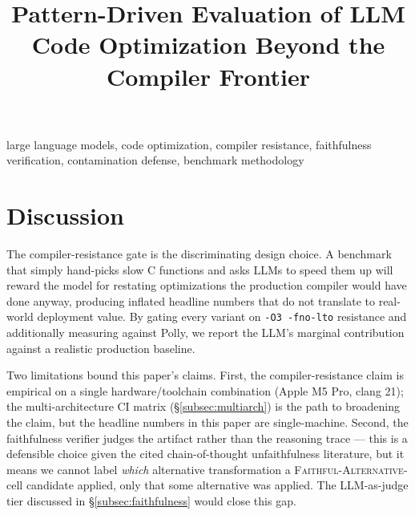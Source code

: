 \documentclass[conference]{IEEEtran}
\begin{document}
\title{Pattern-Driven Evaluation of LLM Code Optimization Beyond the Compiler Frontier}

\author{
}

\maketitle



\begin{IEEEkeywords}
large language models, code optimization, compiler resistance, faithfulness verification, contamination defense, benchmark methodology
\end{IEEEkeywords}









\section{Discussion}\label{sec:discussion}

The compiler-resistance gate is the discriminating design choice. A benchmark that simply hand-picks slow C functions and asks LLMs to speed them up will reward the model for restating optimizations the production compiler would have done anyway, producing inflated headline numbers that do not translate to real-world deployment value. By gating every variant on \texttt{-O3 -fno-lto} resistance and additionally measuring against Polly, we report the LLM's marginal contribution against a realistic production baseline.

Two limitations bound this paper's claims. First, the compiler-resistance claim is empirical on a single hardware/toolchain combination (Apple M5 Pro, clang 21); the multi-architecture CI matrix (\S\ref{subsec:multiarch}) is the path to broadening the claim, but the headline numbers in this paper are single-machine. Second, the faithfulness verifier judges the artifact rather than the reasoning trace --- this is a defensible choice given the cited chain-of-thought unfaithfulness literature, but it means we cannot label \emph{which} alternative transformation a \textsc{Faithful-Alternative}-cell candidate applied, only that some alternative was applied. The LLM-as-judge tier discussed in \S\ref{subsec:faithfulness} would close this gap.
\end{document}
